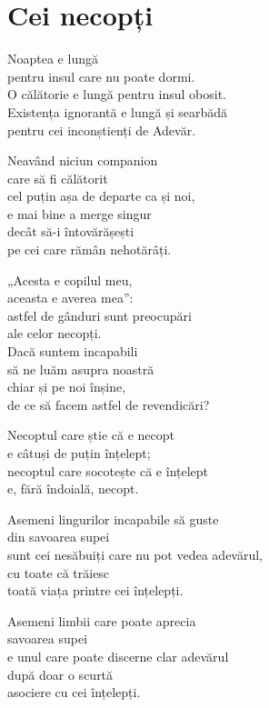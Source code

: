 
\chapter{Cei necopți}

Noaptea e lungă\\
pentru insul care nu poate dormi.\\
O călătorie e lungă pentru insul obosit.\\
Existența ignorantă e lungă și searbădă\\
pentru cei inconștienți de Adevăr.


Neavând niciun companion\\
care să fi călătorit\\
cel puțin așa de departe ca și noi,\\
e mai bine a merge singur\\
decât să-i întovărășești\\
pe cei care rămân nehotărâți.


„Acesta e copilul meu,\\
aceasta e averea mea”:\\
astfel de gânduri sunt preocupări\\
ale celor necopți.\\
Dacă suntem incapabili\\
să ne luăm asupra noastră\\
chiar și pe noi înșine,\\
de ce să facem astfel de revendicări?


Necoptul care știe că e necopt\\
e câtuși de puțin înțelept;\\
necoptul care socotește că e înțelept\\
e, fără îndoială, necopt.


Asemeni lingurilor incapabile să guste\\
din savoarea supei\\
sunt cei nesăbuiți care nu pot vedea adevărul,\\
cu toate că trăiesc\\
toată viața printre cei înțelepți.


Asemeni limbii care poate aprecia\\
savoarea supei\\
e unul care poate discerne clar adevărul\\
după doar o scurtă\\
asociere cu cei înțelepți.


